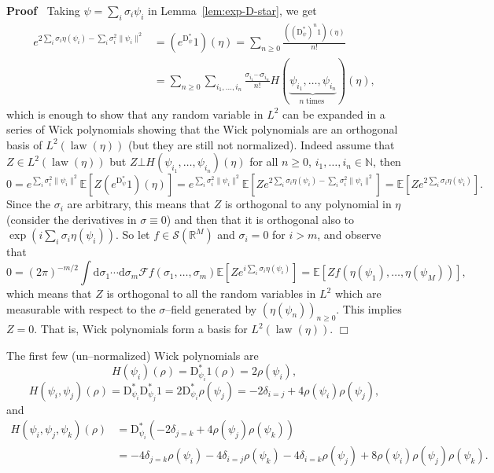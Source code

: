 \documentclass[a4paper,11pt]{article}
\newcommand{\mathD}{\mathrm{D}}
\newcommand{\mathd}{\mathrm{d}}
\newcommand{\tmop}[1]{\ensuremath{\operatorname{#1}}}
\newenvironment{proof}{\noindent\textbf{Proof\ }}{\hspace*{\fill}$\Box$\medskip}
\newcommand{\CF}{\mathscr{F}}
\newcommand{\CS}{\mathscr{S}}
\begin{document}
\begin{proof}
  Taking $\psi = \sum_i \sigma_i \psi_i$ in Lemma~\ref{lem:exp-D-star}, we get
  \begin{align*}
     e^{2 \sum_i \sigma_i \eta (\psi_i) - \sum_i \sigma_i^2 \| \psi_i \|^2} & = (e^{\mathD^{\ast}_{\psi}} 1) (\eta) = \sum_{n \geqslant 0} \frac{((\mathD^{\ast}_{\psi})^n 1) (\eta)}{n!} \\
     & = \sum_{n \geqslant 0} \sum_{i_1, \ldots, i_n} \frac{\sigma_{i_1} \cdots \sigma_{i_n}}{n!} H(\underbrace{_{} \psi_{i_1}, \ldots, \psi_{i_n}}_{n \tmop{times}})(\eta),
  \end{align*}
  which is enough to show that any random variable in $L^2$ can be expanded in
  a series of Wick polynomials showing that the Wick polynomials are an
  orthogonal basis of $L^2 (\tmop{law} (\eta))$ (but they are still not
  normalized). Indeed assume that $Z \in L^2 (\tmop{law} (\eta))$ but $Z \bot
  H (\psi_{i_1}, \ldots, \psi_{i_n}) (\eta)$ for all $n \geqslant 0$, $i_1,
  \ldots, i_n \in \mathbb{N}$, then
  \[ 0 = e^{\sum_i \sigma_i^2 \| \psi_i \|^2} \mathbb{E} [Z
     (e^{\mathD^{\ast}_{\psi}} 1) (\eta)] = e^{\sum_i \sigma_i^2 \| \psi_i
     \|^2} \mathbb{E} [Z e^{2 \sum_i \sigma_i \eta (\psi_i) - \sum_i
     \sigma_i^2 \| \psi_i \|^2}] =\mathbb{E} [Z e^{2 \sum_i \sigma_i \eta
     (\psi_i)}] . \]
  Since the $\sigma_i$ are arbitrary, this means that $Z$ is orthogonal to any
  polynomial in $\eta$ (consider the derivatives in $\sigma \equiv 0$) and then that it is orthogonal also to $\exp ( i
  \sum_i \sigma_i \eta (\psi_i) )$. So let $f \in \CS (\mathbb{R}^M)$
  and $\sigma_i = 0$ for $i > m$, and observe that
  \[ 0 = (2 \pi)^{- m / 2} \int \mathd \sigma_1 \cdots \mathd \sigma_m \CF f
     (\sigma_1, \ldots, \sigma_m) \mathbb{E} [Z e^{i \sum_i \sigma_i \eta
     (\psi_i)}] =\mathbb{E} [Z f (\eta (\psi_1), \ldots, \eta (\psi_M))], \]
  which means that $Z$ is orthogonal to all the random variables in $L^2$
  which are measurable with respect to the $\sigma$--field generated by $(\eta
  (\psi_n))_{n \geqslant 0}$. This implies $Z = 0$. That is, Wick polynomials
  form a basis for $L^2 (\tmop{law} (\eta))$.
\end{proof}

\begin{example}
  The first few (un--normalized) Wick polynomials are
  \[ H (\psi_i) (\rho) = \mathD^{\ast}_{\psi_i} 1(\rho) = 2 \rho (\psi_i), \]
  \[ H (\psi_i, \psi_j) (\rho) = \mathD^{\ast}_{\psi_i} \mathD^{\ast}_{\psi_j}
     1 = 2 \mathD^{\ast}_{\psi_i} \rho (\psi_j) = - 2 \delta_{i = j} + 4 \rho
     (\psi_i) \rho (\psi_j), \]
  and
  \begin{align*}
     H (\psi_i, \psi_j, \psi_k) (\rho) & = \mathD^{\ast}_{\psi_i} (- 2 \delta_{j= k} + 4 \rho (\psi_j) \rho (\psi_k)) \\
     & = - 4 \delta_{j = k} \rho (\psi_i) - 4 \delta_{i = j} \rho (\psi_k) - 4 \delta_{i = k} \rho (\psi_j) + 8 \rho (\psi_i) \rho (\psi_j) \rho (\psi_k).
  \end{align*}
\end{example}
\end{document}
